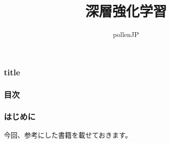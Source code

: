 \documentclass[dvipdfmx,12px]{beamer}
\title{深層強化学習}
\author{pollenJP}
\begin{document}
 	\newcommand{\sectionTitleName}{}
  \begin{frame}
  	\frametitle{title}
  	\titlepage
  \end{frame}
  \begin{frame}
  	\frametitle{目次}
	  \tableofcontents
  \end{frame}
  \begin{frame}
  	\frametitle{はじめに}
	  今回、参考にした書籍を載せておきます。
  \end{frame}
\end{document}
